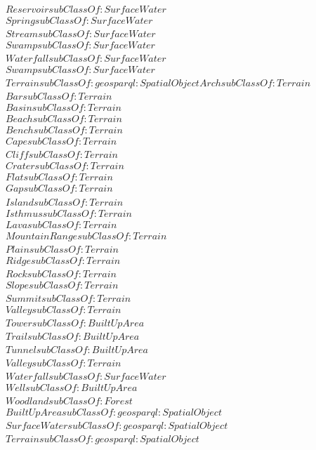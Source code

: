 \begin{align}
  Reservoir subClassOf: SurfaceWater\\
  Spring subClassOf: SurfaceWater\\
  Stream subClassOf: SurfaceWater\\
  Swamp subClassOf: SurfaceWater\\
  Waterfall subClassOf: SurfaceWater\\
  Swamp subClassOf: SurfaceWater\\
  Terrain subClassOf: geosparql:SpatialObject  Arch subClassOf: Terrain\\
  Bar subClassOf: Terrain\\
  Basin subClassOf: Terrain\\
  Beach subClassOf: Terrain\\
  Bench subClassOf: Terrain\\
  Cape subClassOf: Terrain\\
  Cliff subClassOf: Terrain\\
  Crater subClassOf: Terrain\\
  Flat subClassOf: Terrain\\
  Gap subClassOf: Terrain\\
  Island subClassOf: Terrain\\
  Isthmus subClassOf: Terrain\\
  Lava subClassOf: Terrain\\
  MountainRange subClassOf: Terrain\\
  Plain subClassOf: Terrain\\
  Ridge subClassOf: Terrain\\
  Rock subClassOf: Terrain\\
  Slope subClassOf: Terrain\\
  Summit subClassOf: Terrain\\
  Valley subClassOf: Terrain\\
  Tower subClassOf: BuiltUpArea\\
  Trail subClassOf: BuiltUpArea\\
  Tunnel subClassOf: BuiltUpArea\\
  Valley subClassOf: Terrain\\
  Waterfall subClassOf: SurfaceWater\\
  Well subClassOf: BuiltUpArea\\
  Woodland subClassOf: Forest\\
  BuiltUpArea subClassOf: geosparql:SpatialObject\\
  SurfaceWater subClassOf: geosparql:SpatialObject\\
  Terrain subClassOf: geosparql:SpatialObject\end{align}


